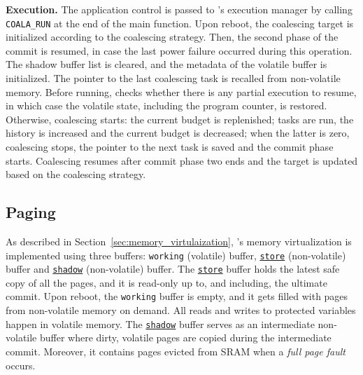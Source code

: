 \textbf{Execution.} The application control is passed to \sys's execution manager by calling \texttt{COALA\_RUN} at the end of the main function. Upon reboot, the coalescing target is initialized according to the coalescing strategy. Then, the second phase of the commit is resumed, in case the last power failure occurred during this operation. The shadow buffer list is cleared, and the metadata of the volatile buffer is initialized. The pointer to the last coalescing task is recalled from non-volatile memory. Before running, \sys checks whether there is any partial execution to resume, in which case the volatile state, including the program counter, is restored. Otherwise, coalescing starts: the current budget is replenished; tasks are run, the history is increased and the current budget is decreased; when the latter is zero, coalescing stops, the pointer to the next task is saved and the commit phase starts. Coalescing resumes after commit phase two ends and the target is updated based on the coalescing strategy. 

\subsection{Paging}

As described in Section~\ref{sec:memory_virtulaization}, \sys's memory virtualization is implemented using three buffers: \texttt{working} (volatile) buffer, \texttt{\underline{store}} (non-volatile) buffer and \texttt{\underline{shadow}} (non-volatile) buffer. The \texttt{\underline{store}} buffer holds the latest safe copy of all the pages, and it is read-only up to, and including, the ultimate commit. Upon reboot, the \texttt{working} buffer is empty, and it gets filled with pages from non-volatile memory on demand. All reads and writes to protected variables happen in volatile memory. The \texttt{\underline{shadow}} buffer serves as an intermediate non-volatile buffer where dirty, volatile pages are copied during the intermediate commit. Moreover, it contains pages evicted from SRAM when a \emph{full page fault} occurs.

